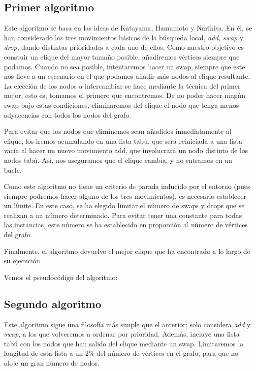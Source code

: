 \subsection{Primer algoritmo}

Este algoritmo se basa en las ideas de Katayama, Hamamoto y Narihisa. En él, se han considerado
los tres movimientos básicos de la búsqueda local, \textit{add, swap} y \textit{drop},
dando distintas prioridades a cada uno de ellos. Como nuestro objetivo es constuir un clique del
mayor tamaño posible, añadiremos vértices siempre que podamos. Cuando no sea posible, intentaremos
hacer un swap, siempre que este nos lleve a un escenario en el que podamos añadir más nodos
al clique resultante. La elección de los nodos a intercambiar se hace mediante la técnica del
primer mejor, esto es, tomamos el primero que encontremos.
De no poder hacer ningún swap bajo estas condiciones, eliminaremos del clique el nodo que
tenga menos adyacencias con todos los nodos del grafo.

Para evitar que los nodos que eliminemos sean añadidos inmediatamente al clique,
los iremos acumulando en una lista tabú, que será reiniciada a una lista vacía al hacer
un nuevo movimiento add, que involucrará un nodo distinto de los nodos tabú. Así, nos aseguramos
que el clique cambia, y no entramos en un bucle.

Como este algoritmo no tiene un criterio de parada inducido por el entorno (pues siempre podremos
hacer alguno de los tres movimientos), es necesario establecer un límite. En este caso, se ha
elegido limitar el número de swaps y drops que se realizan a un número determinado. Para
evitar tener una constante para todas las instancias, este número se ha establecido en proporción
al número de vértices del grafo.

Finalmente, el algoritmo devuelve el mejor clique que ha encontrado a lo largo de su ejecución.

Vemos el pseudocódigo del algoritmo:


\subsection{Segundo algoritmo}

Este algoritmo sigue una filosofía más simple que el anterior; solo considera \textit{add} y
\textit{swap}, a los que volveremos a ordenar por prioridad. Además, incluye una lista tabú con
los nodos que han salido del clique mediante un swap. Limitaremos la longitud de esta lista a
un 2\% del número de vértices en el grafo, para que no aloje un gran número de nodos.


